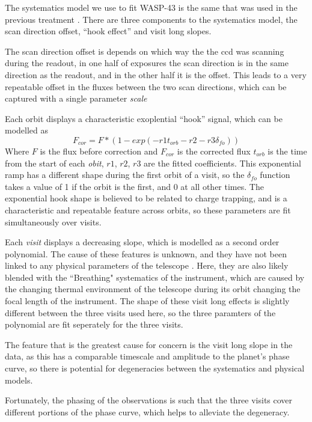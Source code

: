 \documentclass[a4paper,fleqn,usenatbib]{mnras}
\begin{document}
The systematics model we use to fit WASP-43 is the same that was used in the previous treatment \citep{Stevenson2014}. There are three components to the systematics model, the scan direction offset, ``hook effect'' and visit long slopes.

The scan direction offset is depends on which way the the ccd was scanning during the readout, in one half of exposures the scan direction is in the same direction as the readout, and in the other half it is the offset. This leads to a very repeatable offset in the fluxes between the two scan directions, which can be captured with a single parameter \emph{scale}

Each orbit displays a characteristic exoplential ``hook'' signal, which can be modelled as
\begin{equation} \label{eq:hook}
F_{cor} = F*(1-exp(-r1 t_{orb}-r2-r3 \delta_{fo}))
\end{equation}
Where $F$ is the flux before correction and $F_{cor}$ is the corrected flux $t_{orb}$ is the time from the start of each \emph{obit}, $r1$, $r2$, $r3$ are the fitted coefficients. This exponential ramp has a different shape during the first orbit of a visit, so the $\delta_{fo}$ function takes a value of 1 if the orbit is the first, and 0 at all other times. The exponential hook shape is believed to be related to charge trapping, and is a characteristic and repeatable feature across orbits, so these parameters are fit simultaneously over visits.

Each \emph{visit} displays a decreasing slope, which is modelled as a second order polynomial. The cause of these features is unknown, and they have not been linked to any physical parameters of the telescope \cite{Wakeford2016}. Here, they are also likely blended with the ``Breathing" systematics of the instrument, which are caused by the changing thermal environment of the telescope during its orbit changing the focal length of the instrument. The shape of these visit long effects is slightly different between the three visits used here, so the three paramters of the polynomial are fit seperately for the three visits.

The feature that is the greatest cause for concern is the visit long slope in the data, as this has a comparable timescale and amplitude to the planet's phase curve, so there is potential for degeneracies between the systematics and physical models.

Fortunately, the phasing of the observations is such that the three visits cover different portions of the phase curve, which helps to alleviate the degeneracy.
\end{document}
